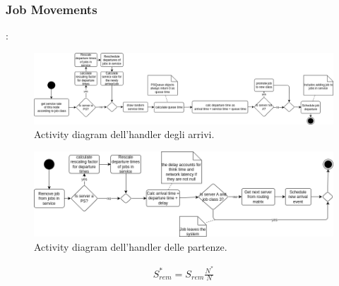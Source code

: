\subsubsection{Job Movements}
\begin{frame}{\subsecname: \subsubsecname}
     {\begin{figure}
        \centering
        \includegraphics[width=1\linewidth]{figs/diagrams/handle_arrival_landscape.drawio.png}
        \caption{Activity diagram dell’handler degli arrivi.}
        \label{fig:enter-label}
    \end{figure}}
     {\begin{figure}
        \centering
        \includegraphics[width=1\linewidth]{figs/diagrams/handle_departure_landscape.drawio.png}
        \caption{Activity diagram dell’handler delle partenze.}
        \label{fig:enter-label}
    \end{figure}}     {\begin{Theorem}
    \begin{equation}
      \begin{aligned}
        S^*_{rem} = S_{rem} \frac{N^*}{N}
      \end{aligned}
      \label{eq:s_rem_star_final_ps}
    \end{equation}
    \end{Theorem}}
\end{frame}

